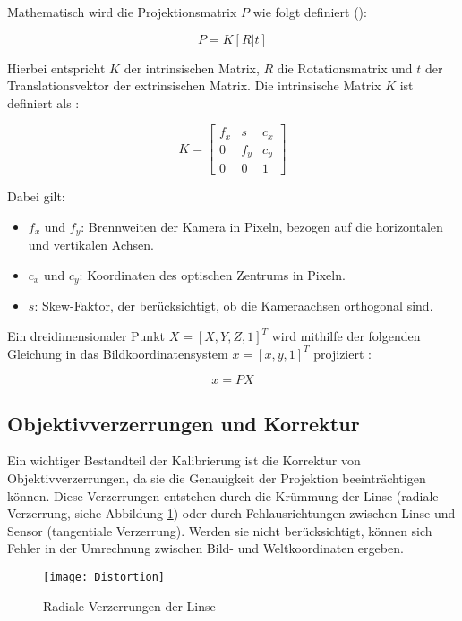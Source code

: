 Mathematisch wird die Projektionsmatrix \(P\) wie folgt definiert (\cite{mw2024calibration, szeliski2022computerVision}):

\[
P = K[R|t]
\]

Hierbei entspricht \(K\) der intrinsischen Matrix, \(R\) die Rotationsmatrix und \(t\) der Translationsvektor der extrinsischen Matrix. Die intrinsische Matrix \(K\) ist definiert als \cite{mw2024calibration}:

\[
K = 
\begin{bmatrix}
f_x & s & c_x \\
0 & f_y & c_y \\
0 & 0 & 1
\end{bmatrix}
\]

Dabei gilt:

\begin{itemize}
    \item \( f_x \) und \( f_y \): Brennweiten der Kamera in Pixeln, bezogen auf die horizontalen und vertikalen Achsen.
    \item \( c_x \) und \( c_y \): Koordinaten des optischen Zentrums in Pixeln.
    \item \( s \): Skew-Faktor, der berücksichtigt, ob die Kameraachsen orthogonal sind.
\end{itemize}

Ein dreidimensionaler Punkt \( X = [X, Y, Z, 1]^T \) wird mithilfe der folgenden Gleichung in das Bildkoordinatensystem \( x = [x, y, 1]^T \) projiziert \cite{mw2024calibration}:

\[
x = PX
\]

\subsection{Objektivverzerrungen und Korrektur}

Ein wichtiger Bestandteil der Kalibrierung ist die Korrektur von Objektivverzerrungen, da sie die Genauigkeit der Projektion beeinträchtigen können. Diese Verzerrungen entstehen durch die Krümmung der Linse (radiale Verzerrung, siehe Abbildung \ref{fig:Distortion}) oder durch Fehlausrichtungen zwischen Linse und Sensor (tangentiale Verzerrung). Werden sie nicht berücksichtigt, können sich Fehler in der Umrechnung zwischen Bild- und Weltkoordinaten ergeben. \cite{mw2024calibration, szeliski2022computerVision}

\begin{figure}
    \centering
    \texttt{[image: Distortion]}
    \caption{Radiale Verzerrungen der Linse \cite{stachniss2021calibration}\label{fig:Distortion}}
\end{figure}


